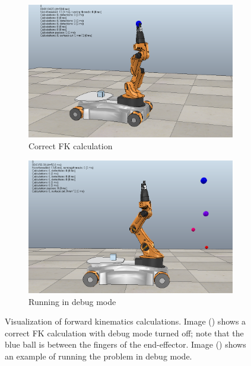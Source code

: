 \vspace{16pt}
\begin{figure}[h]
  \centering
  \begin{subfigure}[b]{0.475\textwidth}
    \centering
    \includegraphics[width=\textwidth]{figures/p2/problem1.png}
    \caption[]%
    {{\small Correct FK calculation}}
    \label{fig:1a}
  \end{subfigure}
  \hfill
  \begin{subfigure}[b]{0.475\textwidth}
    \centering
    \includegraphics[width=\textwidth]{figures/p2/problem1_debug.png}
    \caption[]%
    {{\small Running in debug mode}}
    \label{fig:1b}
  \end{subfigure}
  \caption{Visualization of forward kinematics calculations. Image () shows a correct
    FK calculation with debug mode turned off; note that the blue ball is between the fingers of the
  end-effector. Image () shows an example of running the problem in debug mode.}
  \label{fig:1}
\end{figure}


